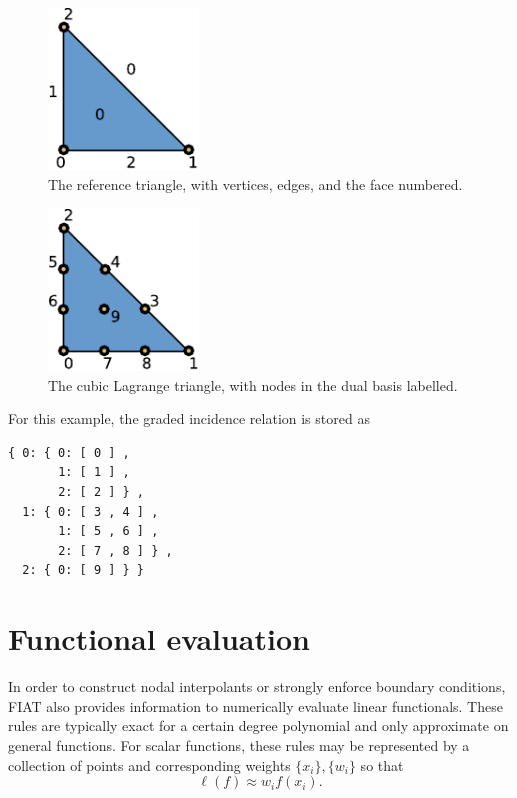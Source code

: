 \begin{figure}
  \label{fig:reftri}
  \begin{center}
    \includegraphics[width=4cm]{chapters/kirby-2/pdf/reftri.pdf}
    \caption{The reference triangle, with vertices, edges, and the
      face numbered.}
  \end{center}
\end{figure}

\begin{figure}
  \label{fig:p3}
  \begin{center}
    \includegraphics[width=4cm]{chapters/kirby-2/pdf/P3.pdf}
    \caption{The cubic Lagrange triangle, with nodes in the dual basis
      labelled.}
  \end{center}
\end{figure}

For this example, the graded incidence relation is stored as
\begin{verbatim}
{ 0: { 0: [ 0 ] ,
       1: [ 1 ] ,
       2: [ 2 ] } ,
  1: { 0: [ 3 , 4 ] ,
       1: [ 5 , 6 ] ,
       2: [ 7 , 8 ] } ,
  2: { 0: [ 9 ] } }
\end{verbatim}


\section{Functional evaluation}

In order to construct nodal interpolants or strongly enforce boundary
conditions, FIAT also provides information to numerically evaluate
linear functionals.  These rules are typically exact for a certain
degree polynomial and only approximate on general functions.  For scalar
functions, these rules may be represented by a collection of points and
corresponding weights \( \{ x_i \} , \{ w_i \} \) so that
\[
\ell( f ) \approx w_i f(x_i).
\]

